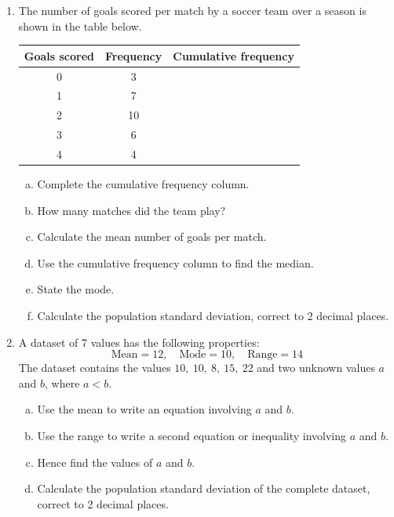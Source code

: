 \documentclass{article}
\begin{document}
\begin{enumerate}
  \item The number of goals scored per match by a soccer team over a season is shown in the table below.
  \begin{center}
    \begin{tabular}{ccc}
      \toprule
      \textbf{Goals scored} & \textbf{Frequency} & \textbf{Cumulative frequency} \\
      \midrule
      0 & 3  & \\
      1 & 7  & \\
      2 & 10 & \\
      3 & 6  & \\
      4 & 4  & \\
      \bottomrule
    \end{tabular}
  \end{center}
  \begin{enumerate}[(a)]
    \item Complete the cumulative frequency column.
    \item How many matches did the team play?
    \item Calculate the mean number of goals per match.
    \item Use the cumulative frequency column to find the median.
    \item State the mode.
    \item Calculate the population standard deviation, correct to 2 decimal places.
  \end{enumerate}

  \item A dataset of 7 values has the following properties:
  \[
    \text{Mean} = 12, \quad \text{Mode} = 10, \quad \text{Range} = 14
  \]
  The dataset contains the values $10,\ 10,\ 8,\ 15,\ 22$ and two unknown values $a$ and $b$, where $a < b$.
  \begin{enumerate}[(a)]
    \item Use the mean to write an equation involving $a$ and $b$.
    \item Use the range to write a second equation or inequality involving $a$ and $b$.
    \item Hence find the values of $a$ and $b$.
    \item Calculate the population standard deviation of the complete dataset, correct to 2 decimal places.
  \end{enumerate}

\end{enumerate}
\end{document}

